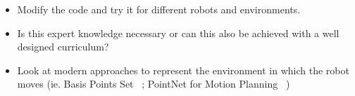 \documentclass[a4paper]{article}
\begin{document}


\begin{itemize}
  \item Modify the code and try it for different robots and environments.
  \item Is this expert knowledge necessary or can this also be achieved with a well designed curriculum?
  \item Look at modern approaches to represent the environment in which the robot moves (ie. Basis Points Set ~\citet{Prokudin2019}; PointNet for Motion Planning ~\citet{Strudel2020})
\end{itemize}


%
\end{document}
